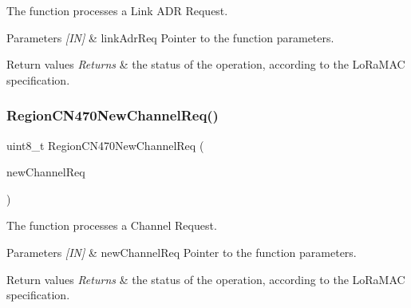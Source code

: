 The function processes a Link A\+DR Request. 


\begin{DoxyParams}{Parameters}
{\em \mbox{[}\+I\+N\mbox{]}} & link\+Adr\+Req Pointer to the function parameters.\\
\hline
\end{DoxyParams}

\begin{DoxyRetVals}{Return values}
{\em Returns} & the status of the operation, according to the Lo\+Ra\+M\+AC specification. \\
\hline
\end{DoxyRetVals}
\mbox{\label{group__REGIONCN470_ga3db01af8efb6f0c07db00b78dcb2ebfe}} 
\subsubsection{\texorpdfstring{Region\+C\+N470\+New\+Channel\+Req()}{RegionCN470NewChannelReq()}}
{\footnotesize\ttfamily uint8\+\_\+t Region\+C\+N470\+New\+Channel\+Req (\begin{DoxyParamCaption}\item[{\hyperlink{group__REGION_gae2abcdb6dbb843c9faf5fd3009eca9d6}{New\+Channel\+Req\+Params\+\_\+t} $\ast$}]{new\+Channel\+Req }\end{DoxyParamCaption})}



The function processes a Channel Request. 


\begin{DoxyParams}{Parameters}
{\em \mbox{[}\+I\+N\mbox{]}} & new\+Channel\+Req Pointer to the function parameters.\\
\hline
\end{DoxyParams}

\begin{DoxyRetVals}{Return values}
{\em Returns} & the status of the operation, according to the Lo\+Ra\+M\+AC specification. \\
\hline
\end{DoxyRetVals}
\mbox{\label{group__REGIONCN470_gad6d2b5fce0ea41dc2416648dcc674287}} 
